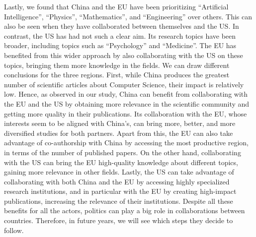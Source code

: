 Lastly, we found that China and the EU have been prioritizing “Artificial Intelligence”, “Physics”, “Mathematics”, and “Engineering” over others. This can also be seen when they have collaborated between themselves and the US. In contrast, the US has had not such a clear aim. Its research topics have been broader, including topics such as “Psychology” and “Medicine”. The EU has benefited from this wider approach by also collaborating with the US on these topics, bringing them more knowledge in the fields.
We can draw different conclusions for the three regions. First, while China produces the greatest number of scientific articles about Computer Science, their impact is relatively low. Hence, as observed in our study, China can benefit from collaborating with the EU and the US by obtaining more relevance in the scientific community and getting more quality in their publications. Its collaboration with the EU, whose interests seem to be aligned with China’s, can bring more, better, and more diversified studies for both partners. Apart from this, the EU can also take advantage of co-authorship with China by accessing the most productive region, in terms of the number of published papers. On the other hand, collaborating with the US can bring the EU high-quality knowledge about different topics, gaining more relevance in other fields. Lastly, the US can take advantage of collaborating with both China and the EU by accessing highly specialized research institutions, and in particular with the EU by creating high-impact publications, increasing the relevance of their institutions. Despite all these benefits for all the actors, politics can play a big role in collaborations between countries. Therefore, in future years, we will see which steps they decide to follow.